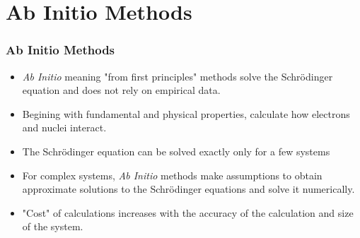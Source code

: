 \documentclass[slidestop,mathserif,compress,xcolor=svgnames]{beamer}
\begin{document}
\section{Ab Initio Methods}
\begin{frame}
\frametitle{\small Ab Initio Methods}
\footnotesize{
\begin{block}{}
\begin{itemize}
\item \emph{Ab Initio} meaning "from first principles" methods solve the Schr\"{o}dinger equation and does not rely on empirical data. 
\item Begining with fundamental and physical properties, calculate how electrons and nuclei interact.
\item The Schr\"{o}dinger equation can be solved exactly only for a few systems
\item For complex systems, \emph{Ab Initio} methods make assumptions to obtain approximate solutions to the  Schr\"{o}dinger equations and solve it numerically.
\item "Cost" of calculations increases with the accuracy of the calculation and size of the system.
\end{itemize}
\end{block}
}
\end{frame}
\end{document}
